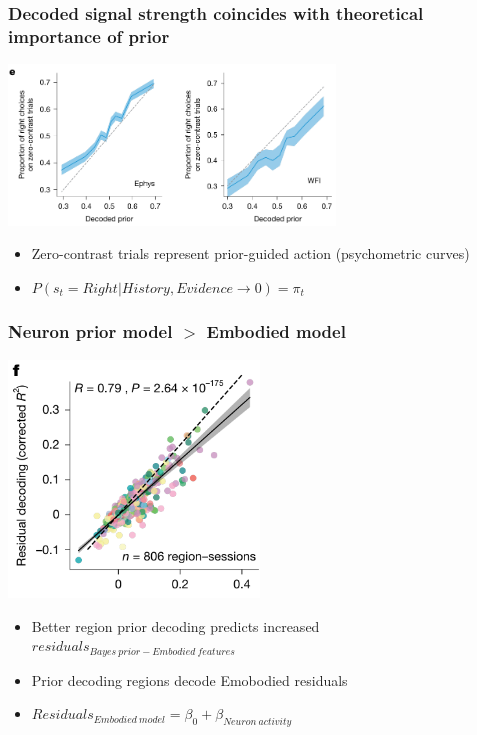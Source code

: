 \documentclass{beamer}
\begin{document}
\begin{frame}
  \frametitle{Decoded signal strength coincides with theoretical importance of prior}
  \begin{center}
    \includegraphics[width=0.65\textwidth, keepaspectratio]{./figure2e}
  \end{center}
  \begin{itemize}
    \item Zero-contrast trials represent prior-guided action (psychometric curves)
    \item $P(s_{t} = Right | History, Evidence \rightarrow 0) = \pi_{t}$
  \end{itemize}
\end{frame}

\begin{frame}
  \frametitle{Neuron prior model $>$ Embodied model}
  \begin{center}
    \includegraphics[width=0.5\textwidth, keepaspectratio]{./figure2f}
  \end{center}
  \begin{itemize}
    \item Better region prior decoding predicts increased $residuals_{Bayes \ prior - Embodied \ features}$
    \item Prior decoding regions decode Emobodied residuals
    \item $Residuals_{Embodied \ model} = \beta_{0} + \beta_{Neuron \ activity}$
  \end{itemize}
\end{frame}
\end{document}

